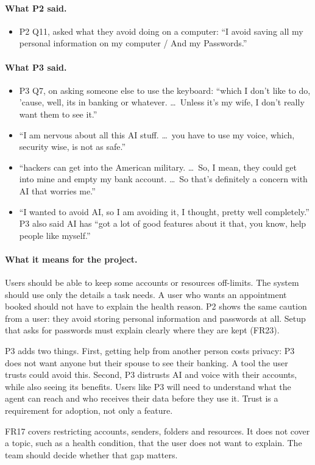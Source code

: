 \documentclass[12pt, titlepage]{article}
\newcommand{\saidtwo}{\paragraph{What P2 said.}}
\newcommand{\saidthree}{\paragraph{What P3 said.}}
\newcommand{\means}{\paragraph{What it means for the project.}}
\begin{document}
\saidtwo
\begin{itemize}
    \item P2 Q11, asked what they avoid doing on a computer: ``I avoid saving all my personal information on my computer / And my Passwords.''
\end{itemize}

\saidthree
\begin{itemize}
    \item P3 Q7, on asking someone else to use the keyboard: ``which I don't like to do, 'cause, well, its in banking or whatever. \ldots\ Unless it's my wife, I don't really want them to see it.''
    \item ``I am nervous about all this AI stuff. \ldots\ you have to use my voice, which, security wise, is not as safe.''
    \item ``hackers can get into the American military. \ldots\ So, I mean, they could get into mine and empty my bank account. \ldots\ So that's definitely a concern with AI that worries me.''
    \item ``I wanted to avoid AI, so I am avoiding it, I thought, pretty well completely.'' P3 also said AI has ``got a lot of good features about it that, you know, help people like myself.''
\end{itemize}

\means
Users should be able to keep some accounts or resources off-limits. The system should use only the details a task needs. A user who wants an appointment booked should not have to explain the health reason. P2 shows the same caution from a user: they avoid storing personal information and passwords at all. Setup that asks for passwords must explain clearly where they are kept (FR23).

P3 adds two things. First, getting help from another person costs privacy: P3 does not want anyone but their spouse to see their banking. A tool the user trusts could avoid this. Second, P3 distrusts AI and voice with their accounts, while also seeing its benefits. Users like P3 will need to understand what the agent can reach and who receives their data before they use it. Trust is a requirement for adoption, not only a feature.

FR17 covers restricting accounts, senders, folders and resources. It does not cover a topic, such as a health condition, that the user does not want to explain. The team should decide whether that gap matters.
\end{document}
